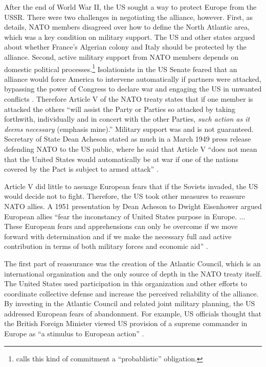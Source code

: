 \documentclass[12pt]{article}
\begin{document}
After the end of World War II, the US sought a way to protect Europe from the USSR. 
There were two challenges in negotiating the alliance, however.
First, as \citet{Poast2019a} details, NATO members disagreed over how to define the North Atlantic area, which was a key condition on military support. 
The US and other states argued about whether France's Algerian colony and Italy should be protected by the alliance. 
Second, active military support from NATO members depends on domestic political processes.\footnote{\citet{Benson2012} calls this kind of commitment a ``probablistic'' obligation.} 
Isolationists in the US Senate feared that an alliance would force America to intervene automatically if partners were attacked, bypassing the power of Congress to declare war and engaging the US in unwanted conflicts \citep[pg. 280-1]{Acheson1969}.
Therefore Article V of the NATO treaty states that if one member is attacked the others ``will assist the Party or Parties so attacked by taking forthwith, individually and in concert with the other Parties, \emph{such action as it deems necessary} (emphasis mine).'' 
Military support was and is not guaranteed. 
Secretary of State Dean Acheson stated as much in a March 1949 press release defending NATO to the US public, where he said that Article V ``does not mean that the United States would automatically be at war if one of the nations covered by the Pact is subject to armed attack'' \citep{Acheson1949}. 


Article V did little to assuage European fears that if the Soviets invaded, the US would decide not to fight. 
Therefore, the US took other measures to reassure NATO allies. 
A 1951 presentation by Dean Acheson to Dwight Eisenhower argued European allies ``fear the inconstancy of United States purpose in Europe. ... These European fears and apprehensions can only be overcome if we move forward with determination and if we make the necessary full and active contribution in terms of both military forces and economic aid'' \citep[pg. 3]{Acheson1951}. 


The first part of reassurance was the creation of the Atlantic Council, which is an international organization and the only source of depth in the NATO treaty itself. 
The United States used participation in this organization and other efforts to coordinate collective defense and increase the perceived reliability of the alliance. 
By investing in the Atlantic Council and related joint military planning, the US addressed European fears of abandonment. 
For example, US officials thought that the British Foreign Minister viewed US provision of a supreme commander in Europe as ``a stimulus to European action'' \citep{Acheson1950}. 
\end{document}
